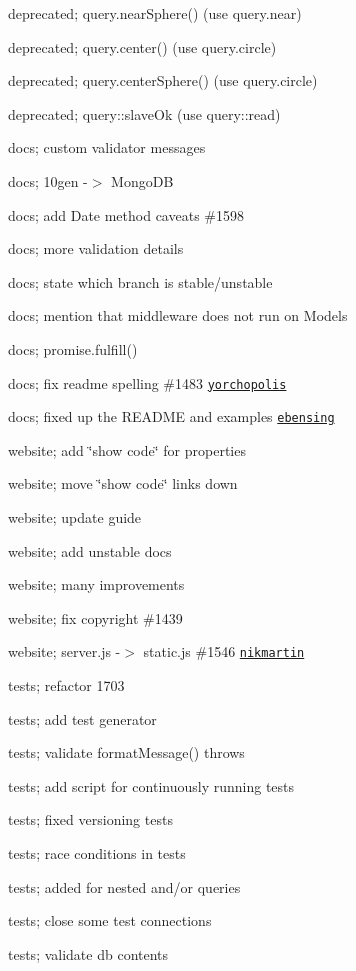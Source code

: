 \begin{DoxyItemize}
\item deprecated; query.\+near\+Sphere() (use query.\+near)
\item deprecated; query.\+center() (use query.\+circle)
\item deprecated; query.\+center\+Sphere() (use query.\+circle)
\item deprecated; query\+::slave\+Ok (use query\+::read)
\item docs; custom validator messages
\item docs; 10gen -\/$>$ Mongo\+DB
\item docs; add Date method caveats \#1598
\item docs; more validation details
\item docs; state which branch is stable/unstable
\item docs; mention that middleware does not run on Models
\item docs; promise.\+fulfill()
\item docs; fix readme spelling \#1483 \href{https://github.com/yorchopolis}{\tt yorchopolis}
\item docs; fixed up the R\+E\+A\+D\+ME and examples \href{https://github.com/ebensing}{\tt ebensing}
\item website; add \char`\"{}show code\char`\"{} for properties
\item website; move \char`\"{}show code\char`\"{} links down
\item website; update guide
\item website; add unstable docs
\item website; many improvements
\item website; fix copyright \#1439
\item website; server.\+js -\/$>$ static.\+js \#1546 \href{https://github.com/nikmartin}{\tt nikmartin}
\item tests; refactor 1703
\item tests; add test generator
\item tests; validate format\+Message() throws
\item tests; add script for continuously running tests
\item tests; fixed versioning tests
\item tests; race conditions in tests
\item tests; added for nested and/or queries
\item tests; close some test connections
\item tests; validate db contents

\end{DoxyItemize}
